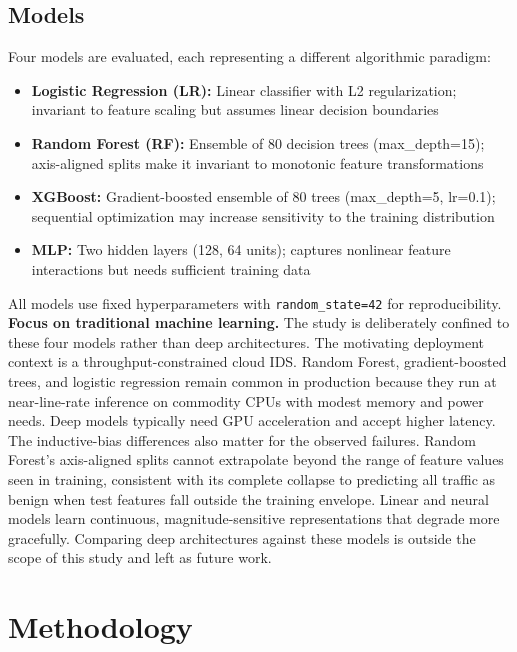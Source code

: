 \documentclass[10pt]{article}
\begin{document}
\subsection{Models}
Four models are evaluated, each representing a different algorithmic paradigm:
\begin{itemize}
\item \textbf{Logistic Regression (LR):} Linear classifier with L2 regularization; invariant to feature scaling but assumes linear decision boundaries
\item \textbf{Random Forest (RF):} Ensemble of 80 decision trees (max\_depth=15); axis-aligned splits make it invariant to monotonic feature transformations
\item \textbf{XGBoost:} Gradient-boosted ensemble of 80 trees (max\_depth=5, lr=0.1); sequential optimization may increase sensitivity to the training distribution
\item \textbf{MLP:} Two hidden layers (128, 64 units); captures nonlinear feature interactions but needs sufficient training data
\end{itemize}
All models use fixed hyperparameters with \texttt{random\_state=42} for reproducibility.
\textbf{Focus on traditional machine learning.} The study is deliberately confined to these four models rather than deep architectures. The motivating deployment context is a throughput-constrained cloud IDS. Random Forest, gradient-boosted trees, and logistic regression remain common in production because they run at near-line-rate inference on commodity CPUs with modest memory and power needs. Deep models typically need GPU acceleration and accept higher latency. The inductive-bias differences also matter for the observed failures. Random Forest's axis-aligned splits cannot extrapolate beyond the range of feature values seen in training, consistent with its complete collapse to predicting all traffic as benign when test features fall outside the training envelope. Linear and neural models learn continuous, magnitude-sensitive representations that degrade more gracefully. Comparing deep architectures against these models is outside the scope of this study and left as future work.
\section{Methodology}
\end{document}
